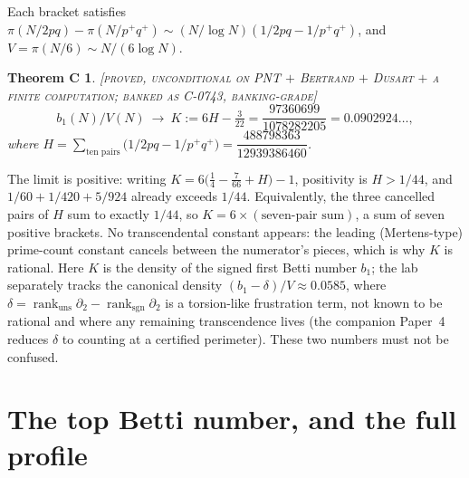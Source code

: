 \documentclass[11pt,reqno]{amsart}
\theoremstyle{plain}
\theoremstyle{definition}
\theoremstyle{plain}
\newtheorem*{thmC}{Theorem C}
\newcommand{\rank}{\operatorname{rank}}
\newcommand{\dd}{\delta}
\newcommand{\st}{\textsc}
\begin{document}
Each bracket satisfies $\pi(N/2pq)-\pi(N/p^+q^+)\sim(N/\log N)(1/2pq-1/p^+q^+)$, and
$V=\pi(N/6)\sim N/(6\log N)$.
\begin{thmC}
\textnormal{\st{[proved, unconditional on PNT $+$ Bertrand $+$ Dusart $+$ a finite
computation; banked as C-0743, banking-grade]}}
\[
b_1(N)/V(N)\ \longrightarrow\ K:=6H-\tfrac{3}{22}=\frac{97360699}{1078282205}=0.0902924\dots,
\]
where $H=\sum_{\text{ten pairs}}\bigl(1/2pq-1/p^+q^+\bigr)=\dfrac{488798363}{12939386460}$.
\end{thmC}
\noindent The limit is positive: writing $K=6\bigl(\tfrac14-\tfrac{7}{66}+H\bigr)-1$, positivity
is $H>1/44$, and $1/60+1/420+5/924$ already exceeds $1/44$. Equivalently, the three cancelled
pairs of $H$ sum to exactly $1/44$, so $K=6\times(\text{seven-pair sum})$, a sum of seven
positive brackets. No transcendental constant appears: the leading (Mertens-type) prime-count
constant cancels between the numerator's pieces, which is why $K$ is rational. Here $K$ is the
density of the signed first Betti number $b_1$; the lab separately tracks the canonical density
$(b_1-\dd)/V\approx0.0585$, where $\dd=\rank_{\text{uns}}\partial_2-\rank_{\text{sgn}}\partial_2$
is a torsion-like frustration term, not known to be rational and where any remaining
transcendence lives (the companion Paper~4 reduces $\dd$ to counting at a certified perimeter).
These two numbers must not be confused.

\section{The top Betti number, and the full profile}\label{sec:top}
\end{document}

